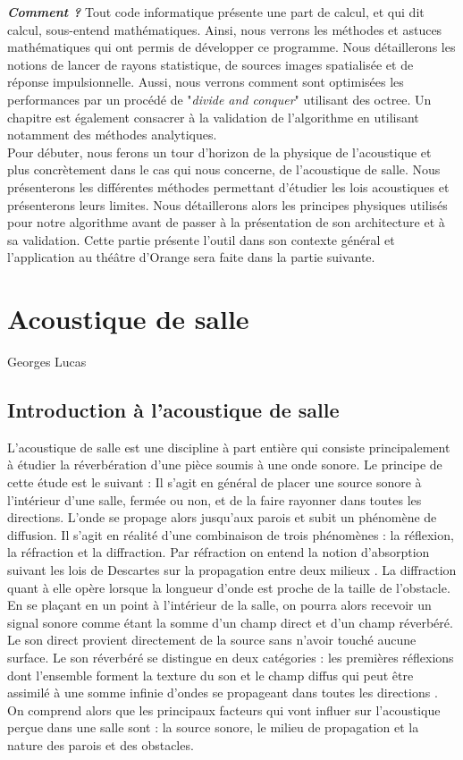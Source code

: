 \textit{\textbf{Comment ?}} Tout code informatique présente une part de calcul, et qui dit calcul, sous-entend mathématiques. Ainsi, nous verrons les méthodes et astuces mathématiques qui ont permis de développer ce programme. Nous détaillerons les notions de lancer de rayons statistique, de sources images spatialisée et de réponse impulsionnelle. Aussi, nous verrons comment sont optimisées les performances par un procédé de "\textit{divide and conquer}" utilisant des octree. Un chapitre est également consacrer à la validation de l'algorithme en utilisant notamment des méthodes analytiques.\\

Pour débuter, nous ferons un tour d'horizon de la physique de l'acoustique et plus concrètement dans le cas qui nous concerne, de l'acoustique de salle. Nous présenterons les différentes méthodes permettant d'étudier les lois acoustiques et présenterons leurs limites. Nous détaillerons alors les principes physiques utilisés pour notre algorithme avant de passer à la présentation de son architecture et à sa validation. Cette partie présente l'outil dans son contexte général et l'application au théâtre d'Orange sera faite dans la partie suivante.


\chapter{Acoustique de salle}
			{Georges Lucas}
		\minitoc
		\newpage
		
\section{Introduction à l'acoustique de salle}
L'acoustique de salle est une discipline à part entière qui consiste principalement à étudier la réverbération d'une pièce soumis à une onde sonore. Le principe de cette étude est le suivant : Il s'agit en général de placer une source sonore à l'intérieur d'une salle, fermée ou non, et de la faire rayonner dans toutes les directions. L'onde se propage alors jusqu'aux parois et subit un phénomène de diffusion. Il s'agit en réalité d'une combinaison de trois phénomènes : la réflexion, la réfraction et la diffraction. Par réfraction on entend la notion d'absorption suivant les lois de Descartes sur la propagation entre deux milieux \cite[p. 3]{jouhaneau}. La diffraction quant à elle opère lorsque la longueur d'onde est proche de la taille de l'obstacle. En se plaçant en un point à l'intérieur de la salle, on pourra alors recevoir un signal sonore comme étant la somme d'un champ direct et d’un champ réverbéré. Le son direct provient directement de la source sans n'avoir touché aucune surface. Le son réverbéré se distingue en deux catégories : les premières réflexions dont l'ensemble forment la texture du son et le champ diffus qui peut être assimilé à une somme infinie d'ondes se propageant dans toutes les directions \cite[p. 9]{jouhaneau}.
On comprend alors que les principaux facteurs qui vont influer sur l'acoustique perçue dans une salle sont : la source sonore, le milieu de propagation et la nature des parois et des obstacles.

